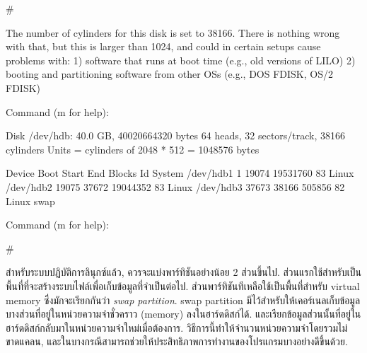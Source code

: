 \begin{thwbr}
\begin{MyExample}
\begin{MyEx}
#  
                                                                                
The number of cylinders for this disk is set to 38166.
There is nothing wrong with that, but this is larger than 1024,
and could in certain setups cause problems with:
1) software that runs at boot time (e.g., old versions of LILO)
2) booting and partitioning software from other OSs
   (e.g., DOS FDISK, OS/2 FDISK)
                                                                                
Command (m for help): 
                                                                                
Disk /dev/hdb: 40.0 GB, 40020664320 bytes
64 heads, 32 sectors/track, 38166 cylinders
Units = cylinders of 2048 * 512 = 1048576 bytes
                                                                                
   Device Boot      Start         End      Blocks   Id  System
/dev/hdb1               1       19074    19531760   83  Linux
/dev/hdb2           19075       37672    19044352   83  Linux
/dev/hdb3           37673       38166      505856   82  Linux swap
                                                                                
Command (m for help): 
                                                                                
# \cursorprompt
\end{MyEx}
\end{MyExample}

สำหรับระบบปฏิบัติการลินุกซ์แล้ว, ควรจะแบ่งพาร์ทิชันอย่างน้อย 2 ส่วนขึ้นไป. ส่วนแรกใช้สำหรับเป็นพื้นที่ที่จะสร้างระบบไฟล์เพื่อเก็บข้อมูลที่จำเป็นต่อไป. ส่วนพาร์ทิชันทีเหลือใช้เป็นพื้นที่สำหรับ virtual memory ซึ่งมักจะเรียกกันว่า \emph{swap partition}. swap partition มีไว้สำหรับให้เคอร์เนลเก็บข้อมูลบางส่วนที่อยู่ในหน่วยความจำชั่วคราว (memory) ลงในฮาร์ดดิสก์ได้. และเรียกข้อมูลส่วนนั้นที่อยู่ในฮาร์ดดิสก์กลับมาในหน่วยความจำใหม่เมื่อต้องการ. วิธีการนี้ทำให้จำนวนหน่วยความจำโดยรวมไม่ขาดแคลน, และในบางกรณีสามารถช่วยให้ประสิทธิภาพการทำงานของโปรแกรมบางอย่างดีขึ้นด้วย. 



\end{thwbr}
